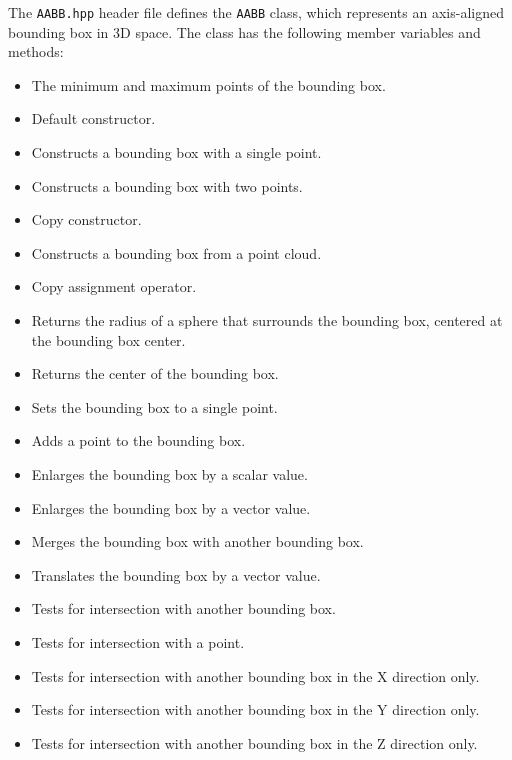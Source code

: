 \documentclass[a4paper,onecolumn,11pt]{doofus}
\begin{document}
The \texttt{AABB.hpp} header file defines the \texttt{AABB} class, which represents an axis-aligned bounding box in 3D space. The class has the following member variables and methods:
%
\begin{itemize}
\item {} The minimum and maximum points of the bounding box.
\item {} Default constructor.
\item {} Constructs a bounding box with a single point.
\item {} Constructs a bounding box with two points.
\item {} Copy constructor.
\item {} Constructs a bounding box from a point cloud.
\item {} Copy assignment operator.
\item {} Returns the radius of a sphere that surrounds the bounding box, centered at the bounding box center.
\item {} Returns the center of the bounding box.
\item {} Sets the bounding box to a single point.
\item {} Adds a point to the bounding box.
\item {} Enlarges the bounding box by a scalar value.
\item {} Enlarges the bounding box by a vector value.
\item {} Merges the bounding box with another bounding box.
\item {} Translates the bounding box by a vector value.
\item {} Tests for intersection with another bounding box.
\item {} Tests for intersection with a point.
\item {} Tests for intersection with another bounding box in the X direction only.
\item {} Tests for intersection with another bounding box in the Y direction only.
\item {} Tests for intersection with another bounding box in the Z direction only.
\end{itemize}
\end{document}
